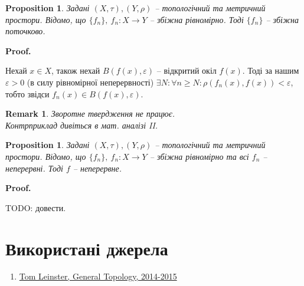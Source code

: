 \documentclass[a4paper, 10pt]{article}
\makeatletter
\theoremstyle{theoremdd}
\newtheorem{definition}[theorem]{Definition}
\newtheorem{proposition}[theorem]{Proposition}
\newtheorem{remark}[theorem]{Remark}
\renewenvironment{proof}[1][Proof.\\]{\par
\pushQED{\hfill \qed}%
\normalfont \topsep6\p@\@plus6\p@\relax
\trivlist
\item\relax
{\bfseries
#1\@addpunct{.}}\hspace\labelsep\ignorespaces
}{%
\popQED\endtrivlist\@endpefalse
}
\makeatother
\begin{document}
\begin{proposition}
Задані $(X,\tau), (Y,\rho)$ -- топологічний та метричний простори. Відомо, що $\{f_n\},\ f_n \colon X \to Y$ -- збіжна рівномірно. Тоді $\{f_n\}$ -- збіжна поточково.
\end{proposition}

\begin{proof}
Нехай $x \in X$, також нехай $B(f(x),\varepsilon)$ -- відкритий окіл $f(x)$. Тоді за нашим $\varepsilon > 0$ (в силу рівномірної неперервності) $\exists N: \forall n \geq N: \rho(f_n(x),f(x)) < \varepsilon$, тобто звідси $f_n(x) \in B(f(x),\varepsilon)$.
\end{proof}

\begin{remark}
Зворотне твердження не працює.\\
\textit{Контрприклад дивіться в мат. аналізі II}.
\end{remark}

\begin{proposition}
Задані $(X,\tau), (Y,\rho)$ -- топологічний та метричний простори. Відомо, що $\{f_n\},\ f_n \colon X \to Y$ -- збіжна рівномірно та всі $f_n$ -- неперервні. Тоді $f$ -- неперервне.
\end{proposition}

\begin{proof}
TODO: довести.
\end{proof}
\newpage

\section*{Використані джерела}
\begin{enumerate}
\item \href{https://www.maths.ed.ac.uk/~tl/topology/topology_notes.pdf}{Tom Leinster, General Topology, 2014-2015}
\end{enumerate}

\iffalse
\begin{definition}
Задано $(X,\tau)$ -- топологічний простір.\\
Ми будемо це називати \textbf{гаусдорфовим простором}, якщо
\begin{align*}
\forall x,y \in X: x \neq y: \exists U_x,U_y \text{ -- відкриті околи точок } x,y: U_x \cap U_y = \emptyset
\end{align*}
\end{definition}
\fi
\end{document}
